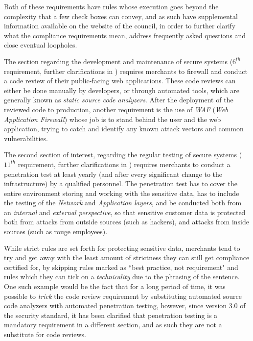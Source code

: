 \documentclass[a4paper,12pt]{article}
\begin{document}
	Both of these requirements have rules whose execution goes beyond the complexity that a few check boxes can convey, and as such have supplemental information available on the website of the council, in order to further clarify what the compliance requirements mean, address frequently asked questions and close eventual loopholes.
	
	The section regarding the development and maintenance of secure systems ($6^{th}$ requirement, further clarifications in \cite{pcireq6}) requires merchants to firewall and conduct a code review of their public-facing web applications. These code reviews can either be done manually by developers, or through automated tools, which are generally known as \textit{static source code analyzers}. After the deployment of the reviewed code to production, another requirement is the use of \textit{WAF} (\textit{Web Application Firewall}) whose job is to stand behind the user and the web application, trying to catch and identify any known attack vectors and common vulnerabilities.
	
	The second section of interest, regarding the regular testing of secure systems ($11^{th}$ requirement, further clarifications in \cite{pcireq11}) requires merchants to conduct a penetration test at least yearly (and after every significant change to the infrastructure) by a qualified personnel. The penetration test has to cover the entire environment storing and working with the sensitive data, has to include the testing of the \textit{Network} and \textit{Application layers}, and be conducted both from an \textit{internal} and \textit{external perspective}, so that sensitive customer data is protected both from attacks from outside sources (such as hackers), and attacks from inside sources (such as rouge employees).
	
	While strict rules are set forth for protecting sensitive data, merchants tend to try and get away with the least amount of strictness they can still get compliance certified for, by skipping rules marked as ``best practice, not requirement" and rules which they can tick on a \textit{technicality} due to the phrasing of the sentence. One such example would be the fact that for a long period of time, it was possible to \textit{trick} the code review requirement by substituting automated source code analyzers with automated penetration testing, however, since version 3.0 of the security standard, it has been clarified that penetration testing is a mandatory requirement in a different section, and as such they are not a substitute for code reviews.
	
\end{document}
